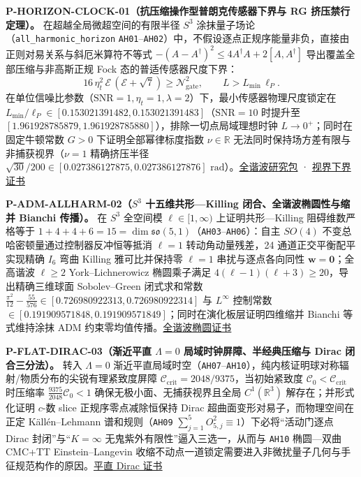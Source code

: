 \documentclass[
  11pt,
  oneside]{book}
\begin{document}
\textbf{P-HORIZON-CLOCK-01（抗压缩操作型普朗克传感器下界与 RG
挤压禁行定理）。} 在超越全局微超空间的有限半径 \(S^3\)
涂抹量子场论（\texttt{all\_\allowbreak harmonic\_\allowbreak horizon}
\texttt{AH01}--\texttt{AH02}）中，不假设逐点正规序能量非负，直接由正则对易关系与斜厄米算符不等式
\(-(A-A^\dagger)^2 \le 4 A^\dagger A + 2[A, A^\dagger]\)
导出覆盖全部压缩与非高斯正规 Fock 态的普适传感器尺度下界： \[
16\,\eta_t^2\,\mathcal{E}\,(\mathcal{E}+\sqrt{7}) \ge \mathcal{N}_{\mathrm{gate}}^2, \qquad L > L_{\min}\,\ell_P.
\]
在单位信噪比参数（\(\mathrm{SNR}=1, \eta_t=1, \lambda=2\)）下，最小传感器物理尺度锁定在
\(L_{\min}/\ell_P \in [0.153021391482, 0.153021391483]\)（\(\mathrm{SNR}=10\)
时提升至 \([1.961928785879, 1.961928785880]\)），排除一切点局域理想时钟
\(L \to 0^+\)；同时在固定牛顿常数 \(G > 0\) 下证明全部幂律标度指数
\(\nu \in \mathbb{R}\) 无法同时保持场方差有限与非捕获视界（\(\nu=1\)
精确挤压半径
\(\sqrt{30}/200 \in [0.027386127875, 0.027386127876]\text{ rad}\)）。\href{../null_source/timelike/finite_stress/lapse_boundary/all_harmonic_horizon/README.md}{全谐波研究包}
·
\href{../../unification/horizon_minimum_scale/result.json}{视界下界证书}

\protect\hypertarget{p-adm-allharm-02}{}{}

\textbf{P-ADM-ALLHARM-02（\(S^3\) 十五维共形---Killing
闭合、全谐波椭圆性与缩并 Bianchi 传播）。} 在 \(S^3\) 全空间模
\(\ell \in [1, \infty)\) 上证明共形---Killing 阻碍维数严格等于
\(1 + 4 + 4 + 6 = 15 = \dim \mathfrak{so}(5,1)\)（\texttt{AH03}--\texttt{AH06}）：自主
\(SO(4)\) 不变总哈密顿量通过控制器反冲恒等抵消 \(\ell=1\)
转动角动量残差，24 通道正交平衡配平实现精确 \(I_6\) 弯曲 Killing
雅可比并保持零 \(\ell=1\) 串扰与逐点各向同性
\(\mathbf{w}=\mathbf{0}\)；全高谐波 \(\ell \ge 2\) York--Lichnerowicz
椭圆乘子满足 \(4(\ell-1)(\ell+3) \ge 20\)，导出精确三维球面
Sobolev--Green 闭式求和常数
\(\frac{\pi^2}{12} - \frac{55}{576} \in [0.726980922313, 0.726980922314]\)
与 \(L^\infty\) 控制常数
\(\in [0.191909571848, 0.191909571849]\)；同时在演化板层证明四维缩并
Bianchi 等式维持涂抹 ADM
约束零均值传播。\href{../../unification/all_harmonic_elliptic/result.json}{全谐波椭圆证书}

\protect\hypertarget{p-flat-dirac-03}{}{}

\textbf{P-FLAT-DIRAC-03（渐近平直 \(\Lambda=0\)
局域时钟屏障、半经典压缩与 Dirac 闭合三分法）。} 转入 \(\Lambda=0\)
渐近平直局域时空（\texttt{AH07}--\texttt{AH10}），纯内核证明球对称辐射/物质分布的尖锐有理紧致度屏障
\(\mathcal{C}_{\mathrm{crit}} = 2048/9375\)，当初始紧致度
\(\mathcal{C}_0 < \mathcal{C}_{\mathrm{crit}}\) 时压缩率
\(\frac{9375}{2048}\mathcal{C}_0 < 1\) 确保无极小面、无捕获视界且全局
\(C^1(\mathbb{R}^3)\) 解存在；并形式化证明 \(c\)-数 slice
正规序零点减除恒保持 Dirac 超曲面变形对易子，而物理空间在正定
Källén--Lehmann 谱和规则（\texttt{AH09}
\(\sum_{j=1}^5 O_{5,j}^2 \equiv 1\)）下必将``活动门逐点 Dirac
封闭''与``\(K=\infty\) 无鬼紫外有限性''逼入三选一，从而与 \texttt{AH10}
椭圆---双曲 CMC+TT Einstein--Langevin
收缩不动点一道锁定需要进入非微扰量子几何与手征规范构作的原因。\href{../../unification/localized_clock_dirac/result.json}{平直
Dirac 证书}
\end{document}
